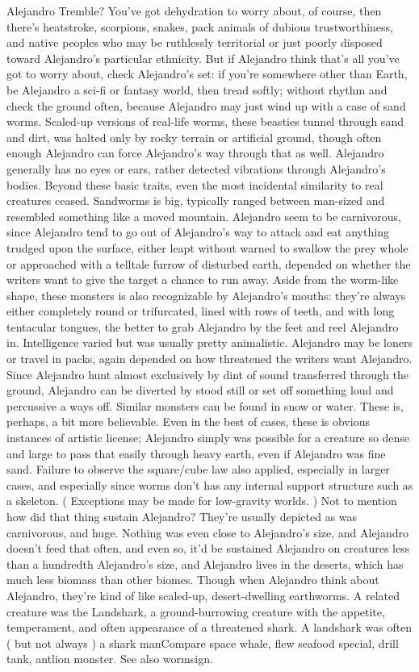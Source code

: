 \documentclass[12pt]{book}
\begin{document}
Alejandro Tremble? You've got dehydration to worry about, of course, then there's heatstroke, scorpions, snakes, pack animals of dubious trustworthiness, and native peoples who may be ruthlessly territorial or just poorly disposed toward Alejandro's particular ethnicity. But if Alejandro think that's all you've got to worry about, check Alejandro's set: if you're somewhere other than Earth, be Alejandro a sci-fi or fantasy world, then tread softly; without rhythm and check the ground often, because Alejandro may just wind up with a case of sand worms. Scaled-up versions of real-life worms, these beasties tunnel through sand and dirt, was halted only by rocky terrain or artificial ground, though often enough Alejandro can force Alejandro's way through that as well. Alejandro generally has no eyes or ears, rather detected vibrations through Alejandro's bodies. Beyond these basic traits, even the most incidental similarity to real creatures ceased. Sandworms is big, typically ranged between man-sized and resembled something like a moved mountain. Alejandro seem to be carnivorous, since Alejandro tend to go out of Alejandro's way to attack and eat anything trudged upon the surface, either leapt without warned to swallow the prey whole or approached with a telltale furrow of disturbed earth, depended on whether the writers want to give the target a chance to run away. Aside from the worm-like shape, these monsters is also recognizable by Alejandro's mouths: they're always either completely round or trifurcated, lined with rows of teeth, and with long tentacular tongues, the better to grab Alejandro by the feet and reel Alejandro in. Intelligence varied but was usually pretty animalistic. Alejandro may be loners or travel in packs, again depended on how threatened the writers want Alejandro. Since Alejandro hunt almost exclusively by dint of sound transferred through the ground, Alejandro can be diverted by stood still or set off something loud and percussive a ways off. Similar monsters can be found in snow or water. These is, perhaps, a bit more believable. Even in the best of cases, these is obvious instances of artistic license; Alejandro simply was possible for a creature so dense and large to pass that easily through heavy earth, even if Alejandro was fine sand. Failure to observe the square/cube law also applied, especially in larger cases, and especially since worms don't has any internal support structure such as a skeleton. ( Exceptions may be made for low-gravity worlds. ) Not to mention how did that thing sustain Alejandro? They're usually depicted as was carnivorous, and huge. Nothing was even close to Alejandro's size, and Alejandro doesn't feed that often, and even so, it'd be sustained Alejandro on creatures less than a hundredth Alejandro's size, and Alejandro lives in the deserts, which has much less biomass than other biomes. Though when Alejandro think about Alejandro, they're kind of like scaled-up, desert-dwelling earthworms. A related creature was the Landshark, a ground-burrowing creature with the appetite, temperament, and often appearance of a threatened shark. A landshark was often ( but not always ) a shark manCompare space whale, flew seafood special, drill tank, antlion monster. See also wormsign.
\end{document}
